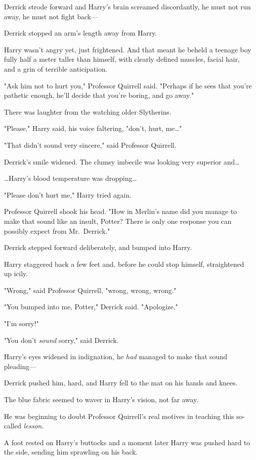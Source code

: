 Derrick strode forward and Harry's brain screamed discordantly, he must not run 
away, he must not fight back---

Derrick stopped an arm's length away from Harry.

Harry wasn't angry yet, just frightened. And that meant he beheld a teenage boy 
fully half a meter taller than himself, with clearly defined muscles, facial 
hair, and a grin of terrible anticipation.

"Ask him not to hurt you," Professor Quirrell said. "Perhaps if he sees that 
you're pathetic enough, he'll decide that you're boring, and go away."

There was laughter from the watching older Slytherins.

"Please," Harry said, his voice faltering, "don't, hurt, me{\ldots}"

"That didn't sound very sincere," said Professor Quirrell.

Derrick's smile widened. The clumsy imbecile was looking very superior 
and{\ldots}

{\ldots}Harry's blood temperature was dropping{\ldots}

"Please don't hurt me," Harry tried again.

Professor Quirrell shook his head. "How in Merlin's name did you manage to make 
that sound like an insult, Potter? There is only one response you can possibly 
expect from Mr.~Derrick."

Derrick stepped forward deliberately, and bumped into Harry.

Harry staggered back a few feet and, before he could stop himself, straightened 
up icily.

"Wrong," said Professor Quirrell, "wrong, wrong, wrong."

"You bumped into me, Potter," Derrick said. "Apologize."

"I'm sorry!"

"You don't \emph{sound} sorry," said Derrick.

Harry's eyes widened in indignation, he \emph{had} managed to make that sound 
pleading---

Derrick pushed him, hard, and Harry fell to the mat on his hands and knees.

The blue fabric seemed to waver in Harry's vision, not far away.

He was beginning to doubt Professor Quirrell's real motives in teaching this 
so-called \emph{lesson.}

A foot rested on Harry's buttocks and a moment later Harry was pushed hard to 
the side, sending him sprawling on his back.

